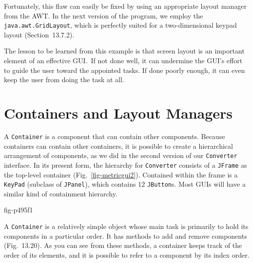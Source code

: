 Fortunately, this flaw can easily be fixed by using an appropriate
layout manager from the AWT. In the next version of the
program, we employ the {\tt java.awt.GridLayout}, which is perfectly suited for
a two-dimensional keypad layout (Section~13.7.2).

The lesson to be learned from this example is that screen layout is an
important element of an effective GUI.~If not done well, it can
undermine the GUI's effort to guide the user toward the appointed
tasks.  If done poorly enough, it can even keep the user from doing the
task at all.






\section{Containers and Layout Managers}
\label{containersand-layout-managers}
\noindent A {\tt Container} is a component that can contain other components.
Because containers can contain other containers, it is possible to
create a hierarchical arrangement of components, as we did in the
second version of our {\tt Converter} interface.  In its present form,
the hierarchy for {\tt Converter} consists of a {\tt JFrame} as the
top-level container (Fig.~\ref{fig-metricgui2}). Contained within
the frame is a {\tt KeyPad} (subclass of {\tt JPanel}), which contains 12 {\tt JButton}s.
Most GUIs will have a similar kind of containment hierarchy.


{fig-p495f1}


A {\tt Container} is a relatively simple object whose main task is
primarily to hold its components in a particular order.  It has
methods to add and remove components (Fig.~13.20).  As you
can see from these methods, a container keeps track of the order of
its elements, and it is possible to refer to a component by its index
order.

